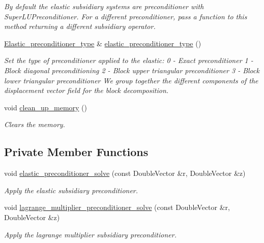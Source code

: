 \begin{DoxyCompactItemize}
\begin{DoxyCompactList}\small\item\em By default the elastic subsidiary systems are preconditioner with Super\+L\+U\+Preconditioner. For a different preconditioner, pass a function to this method returning a different subsidiary operator. \end{DoxyCompactList}\item 
\hyperlink{classoomph_1_1PseudoElasticPreconditioner_acde733e1a111a961d1e714add4e8015d}{Elastic\+\_\+preconditioner\+\_\+type} \& \hyperlink{classoomph_1_1PseudoElasticPreconditioner_a1bae7b43cffbfbce246b736d9e70f908}{elastic\+\_\+preconditioner\+\_\+type} ()
\begin{DoxyCompactList}\small\item\em Set the type of preconditioner applied to the elastic\+: 0 -\/ Exact preconditioner 1 -\/ Block diagonal preconditioning 2 -\/ Block upper triangular preconditioner 3 -\/ Block lower triangular preconditioner We group together the different components of the displacement vector field for the block decomposition. \end{DoxyCompactList}\item 
void \hyperlink{classoomph_1_1PseudoElasticPreconditioner_adcc9487ec16eea12912b2f3a023b4129}{clean\+\_\+up\+\_\+memory} ()
\begin{DoxyCompactList}\small\item\em Clears the memory. \end{DoxyCompactList}\end{DoxyCompactItemize}
\subsection*{Private Member Functions}
\begin{DoxyCompactItemize}
\item 
void \hyperlink{classoomph_1_1PseudoElasticPreconditioner_a9398dd60b00bc611a5b03e859256b410}{elastic\+\_\+preconditioner\+\_\+solve} (const Double\+Vector \&r, Double\+Vector \&z)
\begin{DoxyCompactList}\small\item\em Apply the elastic subsidiary preconditioner. \end{DoxyCompactList}\item 
void \hyperlink{classoomph_1_1PseudoElasticPreconditioner_a071ddbc46bb55f2c11fe0dfe9b69bb4a}{lagrange\+\_\+multiplier\+\_\+preconditioner\+\_\+solve} (const Double\+Vector \&r, Double\+Vector \&z)
\begin{DoxyCompactList}\small\item\em Apply the lagrange multiplier subsidiary preconditioner. \end{DoxyCompactList}\end{DoxyCompactItemize}
